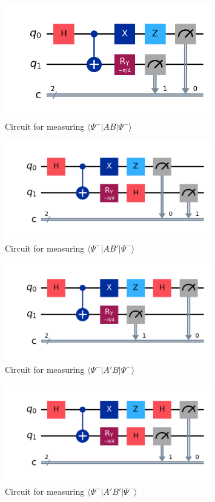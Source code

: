 \documentclass[12pt]{extarticle}
\begin{document}
\begin{enumerate}[(a)]
\begin{figure}[H]
\centering
\includegraphics[width=0.80\textwidth]{images/chsh_ab_qiskit.png}
\caption{Circuit for measuring $\langle \Psi^{-}|AB|\Psi^{-}\rangle$}
\end{figure}
\begin{figure}[H]
\centering
\includegraphics[width=0.80\textwidth]{images/chsh_abp_qiskit.png}
\caption{Circuit for measuring $\langle \Psi^{-}|AB'|\Psi^{-}\rangle$}
\end{figure}
\begin{figure}[H]
\centering
\includegraphics[width=0.80\textwidth]{images/chsh_apb_qiskit.png}
\caption{Circuit for measuring $\langle \Psi^{-}|A'B|\Psi^{-}\rangle$}
\end{figure}
\begin{figure}[H]
\centering
\includegraphics[width=0.80\textwidth]{images/chsh_apbp_qiskit.png}
\caption{Circuit for measuring $\langle \Psi^{-}|A'B'|\Psi^{-}\rangle$}
\end{figure}


\end{enumerate}
\end{document}
